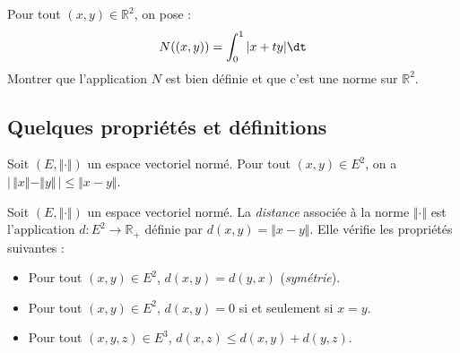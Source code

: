 \documentclass[a4paper,10pt]{report}
\begin{document}
\begin{exa} Pour tout $(x,y) \in \mathbb{R}^2$, on pose :
$$ N((x,y)) = \int_{0}^1 \vert x+ty \vert \dt$$
Montrer que l'application $N$ est bien définie et que c'est une norme sur $\mathbb{R}^2$.
\end{exa}
\subsection{Quelques propriétés et définitions}

\begin{prop} Soit $(E, \Vert \cdot \Vert)$ un espace vectoriel normé. Pour tout $(x,y) \in E^2$, on a $\vert \,  \Vert x \Vert - \Vert y \Vert \, \vert \leq \Vert x-y \Vert$.
\end{prop}

\begin{preuve} 

\vspace{7cm}
\end{preuve}

\begin{defip}
Soit $(E, \Vert \cdot \Vert)$ un espace vectoriel normé. La \textit{distance} associée à la norme $\Vert \cdot \Vert$ est l'application $d : E^2 \rightarrow \mathbb{R}_+$ définie par $d(x,y) = \Vert x- y \Vert$. Elle vérifie les propriétés suivantes :

\begin{itemize}
\item Pour tout $(x,y) \in E^2$, $d(x,y)=d(y,x)$ (\textit{symétrie}).
\item Pour tout $(x,y) \in E^2$, $d(x,y)= 0$ si et seulement si $x=y$.
\item Pour tout $(x,y,z) \in E^3$, $d(x,z) \leq d(x,y) + d(y,z)$.
\end{itemize}
\end{defip}
%
\begin{preuve}
\vspace{6cm}
\end{preuve}
\end{document}
